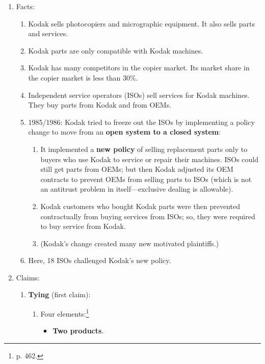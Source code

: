 \begin{enumerate}
    \item Facts:
    \begin{enumerate}
        \item Kodak sells photocopiers and micrographic equipment. It also 
        sells parts and services.
        \item Kodak parts are only compatible with Kodak machines.
        \item Kodak has many competitors in the copier market. Its market 
        share in the copier market is less than 30\%.
        \item Independent service operators (ISOs) sell services for Kodak 
        machines. They buy parts from Kodak and from OEMs.
        \item 1985/1986: Kodak tried to freeze out the ISOs by implementing a 
        policy change to move from an \textbf{open system to a closed system}:
        \begin{enumerate}
            \item It implemented a \textbf{new policy} of selling replacement 
            parts only to buyers who use Kodak to service or repair their 
            machines.  ISOs could still get parts from OEMs; but then Kodak 
            adjusted its OEM contracts to prevent OEMs from selling parts to 
            ISOs (which is not an antitrust problem in itself---exclusive 
            dealing is allowable).
            \item Kodak customers who bought Kodak parts were then prevented 
            contractually from buying services from ISOs; so, they were 
            required to buy service from Kodak.
            \item (Kodak's change created many new motivated plaintiffs.)
        \end{enumerate}
        \item Here, 18 ISOs challenged Kodak's new policy.
    \end{enumerate}
    \item Claims:
    \begin{enumerate}
        \item \textbf{Tying} (first claim):
        \begin{enumerate}
            \item Four elements:\footnote{p. 462.}
            \begin{itemize}
                \item \textbf{Two products}.
                \begin{itemize}

\end{itemize}
\end{itemize}
\end{enumerate}
\end{enumerate}
\end{enumerate}
